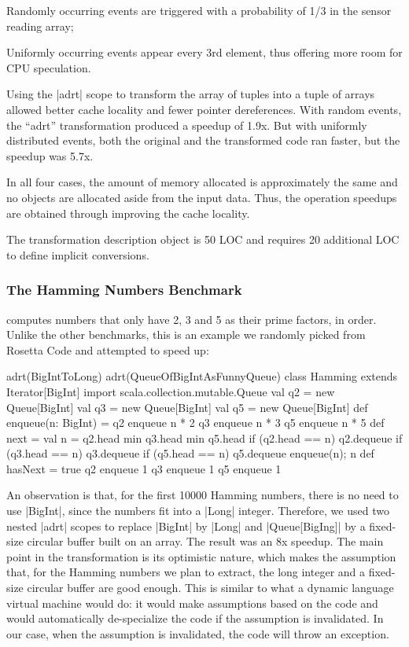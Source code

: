\begin{compactitem}
 \item Randomly occurring events are triggered with a probability of 1/3 in the sensor reading array;
 \item Uniformly occurring events appear every 3rd element, thus offering more room for CPU speculation.
\end{compactitem}

Using the |adrt| scope to transform the array of tuples into a tuple of arrays allowed better cache locality and fewer pointer dereferences. With random events, the ``adrt'' transformation produced a speedup of 1.9x. But with uniformly distributed events, both the original and the transformed code ran faster, but the speedup was 5.7x.

In all four cases, the amount of memory allocated is approximately the same and no objects are allocated aside from the input data. Thus, the operation speedups are obtained through improving the cache locality.

The transformation description object is 50 LOC and requires 20 additional LOC to define implicit conversions.

\subsubsection{The Hamming Numbers Benchmark} computes numbers that only have 2, 3 and 5 as their prime factors, in order. Unlike the other benchmarks, this is an example we randomly picked from Rosetta Code \cite{rosetta-code} and attempted to speed up:

\begin{lstlisting-nobreak}
adrt(BigIntToLong) {
  adrt(QueueOfBigIntAsFunnyQueue) {
    class Hamming extends Iterator[BigInt] {
      import scala.collection.mutable.Queue
      val q2 = new Queue[BigInt]
      val q3 = new Queue[BigInt]
      val q5 = new Queue[BigInt]
      def enqueue(n: BigInt) = {
        q2 enqueue n * 2
        q3 enqueue n * 3
        q5 enqueue n * 5
      }
      def next = {
        val n = q2.head min q3.head min q5.head
        if (q2.head == n) q2.dequeue
        if (q3.head == n) q3.dequeue
        if (q5.head == n) q5.dequeue
        enqueue(n); n
      }
      def hasNext = true
      q2 enqueue 1
      q3 enqueue 1
      q5 enqueue 1
    }
  }
}
\end{lstlisting-nobreak}

An observation is that, for the first 10000 Hamming numbers, there is no need to use |BigInt|, since the numbers fit into a |Long| integer. Therefore, we used two nested |adrt| scopes to replace |BigInt| by |Long| and |Queue[BigIng]| by a fixed-size circular buffer built on an array. The result was an 8x speedup. The main point in the transformation is its optimistic nature, which makes the assumption that, for the Hamming numbers we plan to extract, the long integer and a fixed-size circular buffer are good enough. This is similar to what a dynamic language virtual machine would do: it would make assumptions based on the code and would automatically de-specialize the code if the assumption is invalidated. In our case, when the assumption is invalidated, the code will throw an exception.

